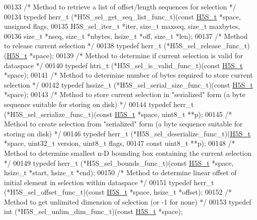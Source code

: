\begin{DoxyCode}
00133 \textcolor{comment}{/* Method to retrieve a list of offset/length sequences for selection */}
00134 \textcolor{keyword}{typedef} herr\_t (*H5S\_sel\_get\_seq\_list\_func\_t)(\textcolor{keyword}{const} \hyperlink{struct_h5_s__t}{H5S\_t} *space, \textcolor{keywordtype}{unsigned} flags,
00135     H5S\_sel\_iter\_t *iter, \textcolor{keywordtype}{size\_t} maxseq, \textcolor{keywordtype}{size\_t} maxbytes,
00136     \textcolor{keywordtype}{size\_t} *nseq, \textcolor{keywordtype}{size\_t} *nbytes, hsize\_t *off, \textcolor{keywordtype}{size\_t} *len);
00137 \textcolor{comment}{/* Method to release current selection */}
00138 \textcolor{keyword}{typedef} herr\_t (*H5S\_sel\_release\_func\_t)(\hyperlink{struct_h5_s__t}{H5S\_t} *space);
00139 \textcolor{comment}{/* Method to determine if current selection is valid for dataspace */}
00140 \textcolor{keyword}{typedef} htri\_t (*H5S\_sel\_is\_valid\_func\_t)(\textcolor{keyword}{const} \hyperlink{struct_h5_s__t}{H5S\_t} *space);
00141 \textcolor{comment}{/* Method to determine number of bytes required to store current selection */}
00142 \textcolor{keyword}{typedef} hssize\_t (*H5S\_sel\_serial\_size\_func\_t)(\textcolor{keyword}{const} \hyperlink{struct_h5_s__t}{H5S\_t} *space);
00143 \textcolor{comment}{/* Method to store current selection in "serialized" form (a byte sequence suitable for storing on disk) */}
00144 \textcolor{keyword}{typedef} herr\_t (*H5S\_sel\_serialize\_func\_t)(\textcolor{keyword}{const} \hyperlink{struct_h5_s__t}{H5S\_t} *space, uint8\_t **p);
00145 \textcolor{comment}{/* Method to create selection from "serialized" form (a byte sequence suitable for storing on disk) */}
00146 \textcolor{keyword}{typedef} herr\_t (*H5S\_sel\_deserialize\_func\_t)(\hyperlink{struct_h5_s__t}{H5S\_t} *space, uint32\_t version, uint8\_t flags,
00147     \textcolor{keyword}{const} uint8\_t **p);
00148 \textcolor{comment}{/* Method to determine smallest n-D bounding box containing the current selection */}
00149 \textcolor{keyword}{typedef} herr\_t (*H5S\_sel\_bounds\_func\_t)(\textcolor{keyword}{const} \hyperlink{struct_h5_s__t}{H5S\_t} *space, hsize\_t *start, hsize\_t *end);
00150 \textcolor{comment}{/* Method to determine linear offset of initial element in selection within dataspace */}
00151 \textcolor{keyword}{typedef} herr\_t (*H5S\_sel\_offset\_func\_t)(\textcolor{keyword}{const} \hyperlink{struct_h5_s__t}{H5S\_t} *space, hsize\_t *offset);
00152 \textcolor{comment}{/* Method to get unlimited dimension of selection (or -1 for none) */}
00153 \textcolor{keyword}{typedef} int (*H5S\_sel\_unlim\_dim\_func\_t)(\textcolor{keyword}{const} \hyperlink{struct_h5_s__t}{H5S\_t} *space);

\end{DoxyCode}
